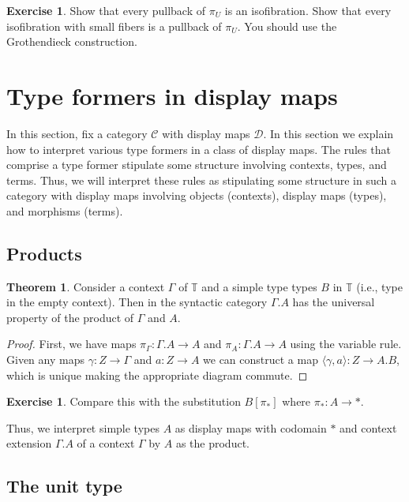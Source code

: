 \documentclass{article}
\theoremstyle{definition}
\newtheorem{theorem}[definition]{Theorem}
\newtheorem{exercise}[definition]{Exercise}
\newcommand{\T}{\mathbb T}
\newcommand{\C}{\mathcal C}
\newcommand{\D}{\mathcal D}
\begin{document}
\begin{exercise}
    Show that every pullback of $\pi_U$ is an isofibration. Show that every isofibration with small fibers is a pullback of $\pi_U$. You should use the Grothendieck construction.
\end{exercise}

\section{Type formers in display maps}

In this section, fix a category $\C$ with display maps $\D$. In this section we explain how to interpret various type formers in a class of display maps. The rules that comprise a type former stipulate some structure involving contexts, types, and terms. Thus, we will interpret these rules as stipulating some structure in such a category with display maps involving objects (contexts), display maps (types), and morphisms (terms).

\subsection{Products}

\begin{theorem}
    Consider a context $\Gamma$ of $\T$ and a simple type types $B$ in $\T$ (i.e., type in the empty context). Then in the syntactic category $\Gamma. A$ has the universal property of the product of $\Gamma$ and $A$.
\end{theorem}
\begin{proof}
    First, we have maps $\pi_\Gamma : \Gamma. A \to A$ and $\pi_A : \Gamma. A \to A$ using the variable rule. Given any maps $\gamma : Z \to \Gamma$ and $a: Z \to A$ we can construct a map $\langle \gamma , a \rangle : Z \to A . B$, which is unique making the appropriate diagram commute.
\end{proof}

\begin{exercise}
    Compare this with the substitution $B[\pi_*]$ where $\pi_* : A \to *$.
\end{exercise}

Thus, we interpret simple types $A$ as display maps with codomain $*$ and context extension $\Gamma.A$ of a context $\Gamma$ by $A$ as the product.

\subsection{The unit type}
\end{document}
